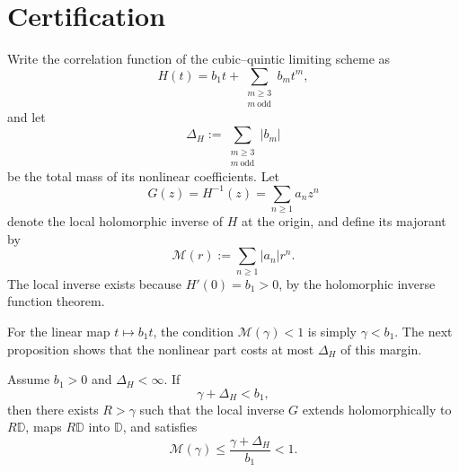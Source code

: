 \section{Certification}
\label{sec:certification}

Write the correlation function of the cubic--quintic limiting scheme as
\begin{equation}
  H(t)=b_1t+\sum_{\substack{m\ge 3\\ m\ \mathrm{odd}}} b_m t^m,
  \label{eq:certification-H-series}
\end{equation}
and let
\begin{equation}
  \Delta_H:=\sum_{\substack{m\ge 3\\ m\ \mathrm{odd}}}|b_m|
  \label{eq:nonlinear-coefficient-mass}
\end{equation}
be the total mass of its nonlinear coefficients.  Let
\[
  G(z)=H^{-1}(z)=\sum_{n\ge1}a_nz^n
\]
denote the local holomorphic inverse of $H$ at the origin, and define its
majorant by
\begin{equation}
  \mathcal M(r):=\sum_{n\ge1}|a_n|r^n.
  \label{eq:inverse-majorant-certification}
\end{equation}
The local inverse exists because $H'(0)=b_1>0$, by the holomorphic inverse
function theorem.

For the linear map $t\mapsto b_1t$, the condition $\mathcal M(\gamma)<1$ is
simply $\gamma<b_1$.  The next proposition shows that the nonlinear part costs
at most $\Delta_H$ of this margin.

\begin{proposition}
\label{prop:inverse-certificate-near-linearity}
Assume $b_1>0$ and $\Delta_H<\infty$.  If
\begin{equation}
  \gamma+\Delta_H<b_1,
  \label{eq:near-linearity-condition}
\end{equation}
then there exists $R>\gamma$ such that the local inverse $G$ extends
holomorphically to $R\mathbb D$, maps $R\mathbb D$ into $\mathbb D$, and
satisfies
\begin{equation}
  \mathcal M(\gamma)
  \le \frac{\gamma+\Delta_H}{b_1}
  <1.
  \label{eq:near-linearity-conclusion}
\end{equation}
\end{proposition}

